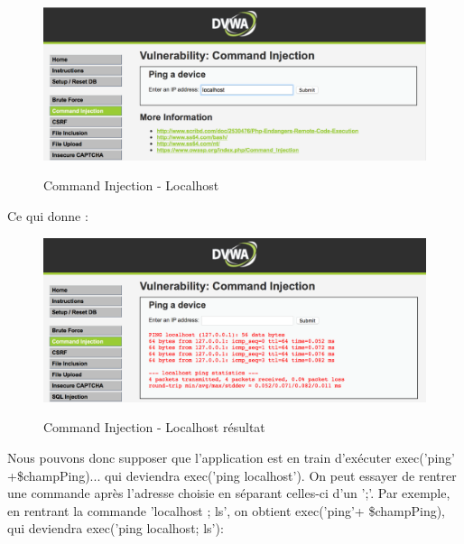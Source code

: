 \begin{figure}[!h]
\begin{center}

\label{inclusion}
\includegraphics[scale=0.5]{images/bf2.png}

\caption{Command Injection - Localhost}

\end{center}
\end{figure}

Ce qui donne :

\begin{figure}[!h]
\begin{center}

\label{inclusion}
\includegraphics[scale=0.5]{images/bf3.png}

\caption{Command Injection - Localhost résultat}

\end{center}
\end{figure}

Nous pouvons donc supposer que l'application est en train d'exécuter exec('ping' +\$champPing)... qui deviendra exec('ping localhost').
On peut essayer de rentrer une commande après l'adresse choisie en séparant celles-ci d'un ';'. Par exemple, en rentrant la commande 'localhost ; ls', on obtient exec('ping'+ \$champPing), qui deviendra exec('ping localhost; ls'):

